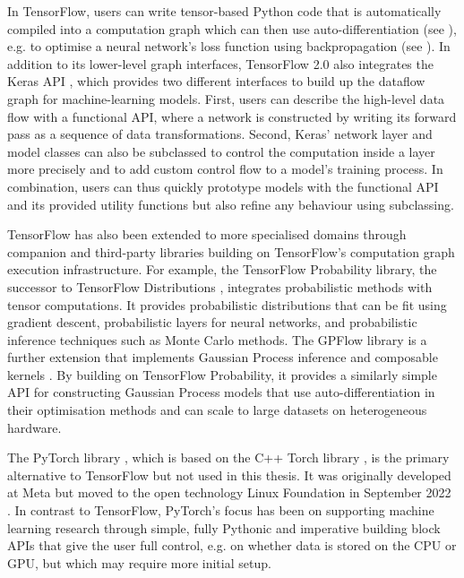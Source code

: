 In TensorFlow, users can write tensor-based Python code that is automatically compiled into a computation graph which can then use auto-differentiation (see ), e.g. to optimise a neural network's loss function using backpropagation (see ). In addition to its lower-level graph interfaces, TensorFlow 2.0 also integrates the Keras API \cite{keras-2015}, which provides two different interfaces to build up the dataflow graph for machine-learning models. First, users can describe the high-level data flow with a functional API, where a network is constructed by writing its forward pass as a sequence of data transformations. Second, Keras' network layer and model classes can also be subclassed to control the computation inside a layer more precisely and to add custom control flow to a model's training process. In combination, users can thus quickly prototype models with the functional API and its provided utility functions but also refine any behaviour using subclassing.

TensorFlow has also been extended to more specialised domains through companion and third-party libraries building on TensorFlow's computation graph execution infrastructure. For example, the TensorFlow Probability library, the successor to TensorFlow Distributions \cite{tensorflow-distributions-2017}, integrates probabilistic methods with tensor computations. It provides probabilistic distributions that can be fit using gradient descent, probabilistic layers for neural networks, and probabilistic inference techniques such as Monte Carlo methods. The GPFlow library is a further extension that implements Gaussian Process inference and composable kernels \cite{gpflow-2017, gpflow-2020}. By building on TensorFlow Probability, it provides a similarly simple API for constructing Gaussian Process models that use auto-differentiation in their optimisation methods and can scale to large datasets on heterogeneous hardware.

The PyTorch library \cite{pytorch-2019}, which is based on the C++ Torch library \cite{torch-2002}, is the primary alternative to TensorFlow but not used in this thesis. It was originally developed at Meta but moved to the open technology Linux Foundation in September 2022 \cite{pytorch-linux-2022}. In contrast to TensorFlow, PyTorch's focus has been on supporting machine learning research through simple, fully Pythonic and imperative building block APIs that give the user full control, e.g. on whether data is stored on the CPU or GPU, but which may require more initial setup.

